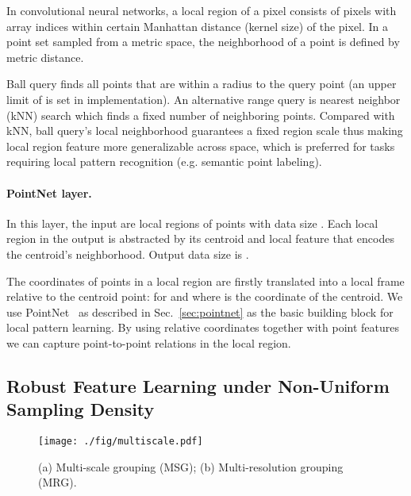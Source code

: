 \documentclass{article}
\begin{document}
In convolutional neural networks, a local region of a pixel consists of pixels with array indices within certain Manhattan distance (kernel size) of the pixel. In a point set sampled from a metric space, the neighborhood of a point is defined by metric distance.

Ball query finds all points that are within a radius to the query point (an upper limit of  is set in implementation). An alternative range query is  nearest neighbor (kNN) search which finds a fixed number of neighboring points. Compared with kNN, ball query's local neighborhood guarantees a fixed region scale thus making local region feature more generalizable across space, which is preferred for tasks requiring local pattern recognition (e.g. semantic point labeling).






\vspace{-0.3cm}
\paragraph{PointNet layer.}
In this layer, the input are  local regions of points with data size . Each local region in the output is abstracted by its centroid and local feature that encodes the centroid's neighborhood. Output data size is .

The coordinates of points in a local region are firstly translated into a local frame relative to the centroid point:  for  and  where  is the coordinate of the centroid. We use PointNet~\cite{qi2016pointnet} as described in Sec.~\ref{sec:pointnet} as the basic building block for local pattern learning. By using relative coordinates together with point features we can capture point-to-point relations in the local region.



\vspace{-0.3cm}
\subsection{Robust Feature Learning under Non-Uniform Sampling Density}
\label{sec:pointnet2++}

\begin{wrapfigure}{R}{4cm}
  \vspace{-10pt}
  \begin{center}
    \texttt{[image: ./fig/multiscale.pdf]}
  \end{center}  \vspace{-15pt}
  \caption{(a) Multi-scale grouping (MSG); (b) Multi-resolution grouping (MRG).}
  \label{fig:multiscale}
\end{wrapfigure}
\end{document}
